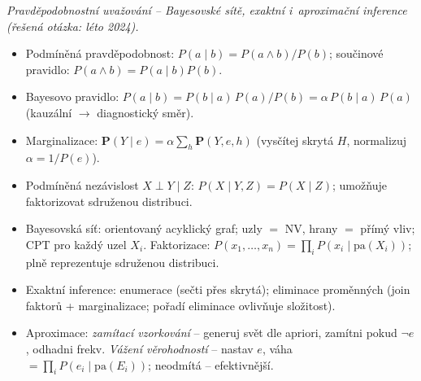 \begin{poznamka}
\smallskip
\emph{Pravděpodobnostní uvažování -- Bayesovské sítě, exaktní i~aproximační inference (řešená otázka: léto 2024).}
\begin{itemize}
  \item Podmíněná pravděpodobnost: $P(a\mid b)=P(a\wedge b)/P(b)$; součinové pravidlo: $P(a\wedge b)=P(a\mid b)P(b)$.
  \item Bayesovo pravidlo: $P(a\mid b)=P(b\mid a)\,P(a)/P(b)=\alpha\,P(b\mid a)\,P(a)$ (kauzální $\to$ diagnostický směr).
  \item Marginalizace: $\mathbf{P}(Y\mid e)=\alpha\sum_{h}\mathbf{P}(Y,e,h)$ (vysčítej skrytá $H$, normalizuj $\alpha=1/P(e)$).
  \item Podmíněná nezávislost $X\perp Y\mid Z$: $P(X\mid Y,Z)=P(X\mid Z)$; umožňuje faktorizovat sdruženou distribuci.
  \item Bayesovská síť: orientovaný acyklický graf; uzly $=$ NV, hrany $=$ přímý vliv; CPT pro každý uzel $X_i$. Faktorizace: $P(x_1,\dots,x_n)=\prod_i P(x_i\mid\mathrm{pa}(X_i))$; plně reprezentuje sdruženou distribuci.
  \item Exaktní inference: enumerace (sečti přes skrytá); eliminace proměnných (join faktorů + marginalizace; pořadí eliminace ovlivňuje složitost).
  \item Aproximace: \emph{zamítací vzorkování} -- generuj svět dle apriori, zamítni pokud $\neg e$, odhadni frekv. \emph{Vážení věrohodností} -- nastav $e$, váha $=\prod_i P(e_i\mid\mathrm{pa}(E_i))$; neodmítá -- efektivnější.
\end{itemize}


\end{poznamka}
